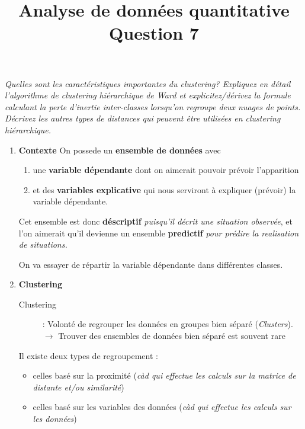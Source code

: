 \documentclass[a4paper, 11pt, onecolumn]{article}
\title{Analyse de données quantitative\\Question 7}
\date{}
\begin{document}
\maketitle

\textit{Quelles sont les caractéristiques importantes du clustering? Expliquez en détail l’algorithme de clustering hiérarchique de Ward et explicitez/dérivez la formule calculant la perte d’inertie inter-classes lorsqu’on regroupe deux nuages de points. Décrivez les autres types de distances qui peuvent être utilisées en clustering hiérarchique.}

\begin{enumerate}
\item \textbf{Contexte}
  On possede un \textbf{ensemble de données} avec 
  
  \begin{enumerate}
    \item {une \textbf{variable dépendante} dont on aimerait pouvoir prévoir l'apparition}
    \item {et des \textbf{variables explicative} qui nous serviront à expliquer (prévoir) la variable dépendante.}
  \end{enumerate}
  
  Cet ensemble est donc \textbf{déscriptif} \textit{puisqu'il décrit une situation observée}, et l'on aimerait qu'il devienne un ensemble\textbf{ predictif} \textit{pour prédire la realisation de situations.}

On va essayer de répartir la variable dépendante dans différentes classes.

  \begin{description}
  \end{description}

\item \textbf{Clustering}

  \begin{description}
    \item[Clustering] : Volonté de regrouper les données en groupes bien séparé (\textit{Clusters}). $\rightarrow$ Trouver des ensembles de données bien séparé est souvent rare
  \end{description}

Il existe deux types de regroupement : 
\begin{itemize}
  \item celles basé sur la proximité (\textit{càd qui effectue
les calculs sur la matrice de distante et/ou similarité})
\item celles basé sur les variables des données (\textit{càd qui effectue les calculs sur les
  données})
  \end{itemize}


\end{enumerate}
\end{document}

